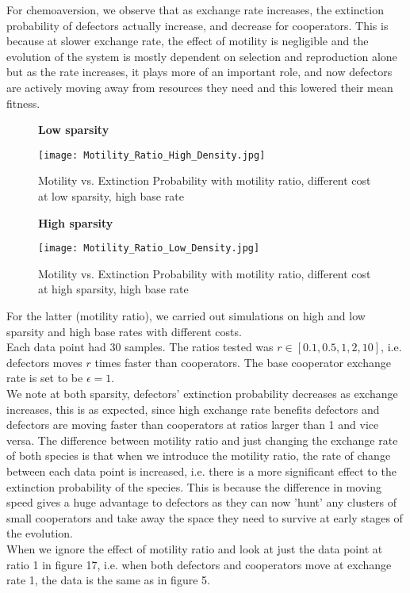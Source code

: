 \documentclass[11pt]{article}
\begin{document}
\noindent For chemoaversion, we observe that as exchange rate increases, the extinction probability of defectors actually increase, and decrease for cooperators. This is because at slower exchange rate, the effect of motility is negligible and the evolution of the system is mostly dependent on selection and reproduction alone but as the rate increases, it plays more of an important role, and now defectors are actively moving away from resources they need and this lowered their mean fitness.\\
\begin{figure}[H]
    \centering
    \textbf{Low sparsity}\par
    \texttt{[image: Motility\_Ratio\_High\_Density.jpg]}
    \caption{Motility vs. Extinction Probability with motility ratio, different cost at low sparsity, high base rate}
\end{figure}
\begin{figure}[H]
    \centering
    \textbf{High sparsity}\par
    \texttt{[image: Motility\_Ratio\_Low\_Density.jpg]}
    \caption{Motility vs. Extinction Probability with motility ratio, different cost at high sparsity, high base rate}
\end{figure}
\noindent For the latter (motility ratio), we carried out simulations on high and low sparsity and high base rates with different costs.\\
Each data point had 30 samples. The ratios tested was $r\in[0.1,0.5,1,2,10]$, i.e. defectors moves $r$ times faster than cooperators. The base cooperator exchange rate is set to be $\epsilon=1$.\\
We note at both sparsity, defectors' extinction probability decreases as exchange increases, this is as expected, since high exchange rate benefits defectors and defectors are moving faster than cooperators at ratios larger than 1 and vice versa. The difference between motility ratio and just changing the exchange rate of both species is that when we introduce the motility ratio, the rate of change between each data point is increased, i.e. there is a more significant effect to the extinction probability of the species. This is because the difference in moving speed gives a huge advantage to defectors as they can now 'hunt' any clusters of small cooperators and take away the space they need to survive at early stages of the evolution.\\
When we ignore the effect of motility ratio and look at just the data point at ratio 1 in figure 17, i.e. when both defectors and cooperators move at exchange rate 1, the data is the same as in figure 5.\\
\end{document}
